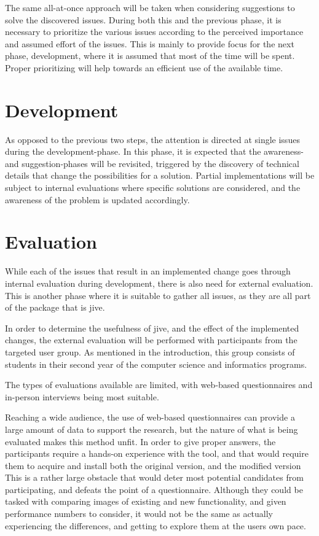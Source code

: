 The same all-at-once approach will be taken when considering suggestions to solve the discovered issues.
During both this and the previous phase, it is necessary to prioritize the various issues according to the perceived importance and assumed effort of the issues.
This is mainly to provide focus for the next phase, development, where it is assumed that most of the time will be spent.
Proper prioritizing will help towards an efficient use of the available time. 

\section{Development}\label{methDevelop}

As opposed to the previous two steps, the attention is directed at single issues during the development-phase.
In this phase, it is expected that the awareness- and suggestion-phases will be revisited, triggered by the discovery of technical details that change the possibilities for a solution.
Partial implementations will be subject to internal evaluations where specific solutions are considered, and the awareness of the problem is updated accordingly.

\section{Evaluation}\label{methEval}

While each of the issues that result in an implemented change goes through internal evaluation during development, there is also need for external evaluation.
This is another phase where it is suitable to gather all issues, as they are all part of the package that is \gls{jive}.

In order to determine the usefulness of \gls{jive}, and the effect of the implemented changes, the external evaluation will be performed with participants from the targeted user group.
As mentioned in the introduction, this group consists of students in their second year of the computer science and informatics programs.

The types of evaluations available are limited, with web-based questionnaires and in-person interviews being most suitable.

Reaching a wide audience, the use of web-based questionnaires can provide a large amount of data to support the research, but the nature of what is being evaluated makes this method unfit.
In order to give proper answers, the participants require a hands-on experience with the tool, and that would require them to acquire and install both the original version, and the modified version
This is a rather large obstacle that would deter most potential candidates from participating, and defeats the point of a questionnaire.
Although they could be tasked with comparing images of existing and new functionality, and given performance numbers to consider, it would not be the same as actually experiencing the differences, and getting to explore them at the users own pace.

